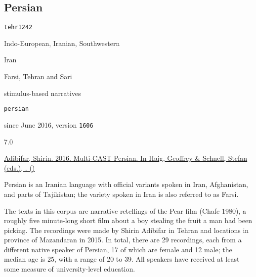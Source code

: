 \subsection{Persian}
\label{ssec:corpus-persian}

\noindent{}

\begin{description}[labelwidth=6.5em,itemindent=0em,itemsep=0.25mm]
	\TabPositions{2em}
	\raggedright\small
	\item[glottocode]		\texttt{tehr1242}
	\item[affiliation]		Indo-European, Iranian, Southwestern
	\item[area spoken]		Iran
	\item[varieties rec'd]	Farsi, Tehran and Sari
	\item[text types]		stimulus-based narratives
	\medskip
	\item[identifier]		\texttt{persian}
	\item[availability]		since June 2016, version \texttt{1606}
	\item[GRAID]		7.0		
	\item[RefIND]		\checkno{}
	\item[ISNRef]		\checkno{}
	\item[citation]		\hyperref[ssec:references-mc]{Adibifar, Shirin. 2016. Multi-CAST Persian. In Haig, Geoffrey \& Schnell, Stefan (eds.), . ()} \nocite{Adibifar2016}
\end{description}

\noindent Persian is an Iranian language with official variants spoken in Iran, Afghanistan, and parts of Tajikistan; the variety spoken in Iran is also referred to as Farsi.

The texts in this corpus are narrative retellings of the Pear film (Chafe 1980), a roughly five minute-long short film about a boy stealing the fruit a man had been picking. The recordings were made by Shirin Adibifar in Tehran and locations in province of Mazandaran in 2015. In total, there are 29 recordings, each from a different native speaker of Persian, 17 of which are female and 12 male; the median age is 25, with a range of 20 to 39. All speakers have received at least some measure of university-level education.

